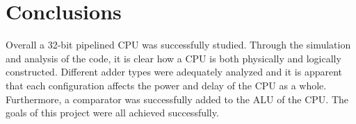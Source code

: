 \documentclass[12pt]{article}
\begin{document}
\section{Conclusions}
Overall a 32-bit pipelined CPU was successfully studied. Through the simulation and analysis of the code, it is clear how a CPU is both physically and logically constructed. Different adder types were adequately analyzed and it is apparent that each configuration affects the power and delay of the CPU as a whole. Furthermore, a comparator was successfully added to the ALU of the CPU. The goals of this project were all achieved successfully.
\end{document}
